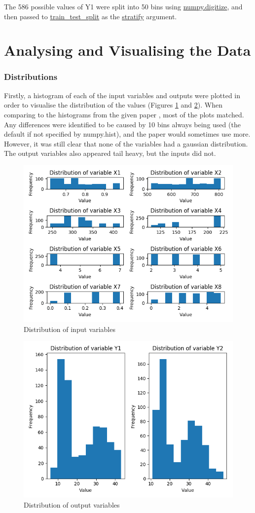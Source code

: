 \documentclass[12pt]{article}
\begin{document}
The 586 possible values of Y1 were split into 50 bins using \url{numpy.digitize}, and then passed to \url{train_test_split} as the \url{stratify} argument. 

\part{Analysing and Visualising the Data}

\section{Distributions}

Firstly, a histogram of each of the input variables and outputs were plotted in order to visualise the distribution of the values (Figures \ref{fig:xdist} and \ref{fig:ydist}). When comparing to the histograms from the given paper \cite{tsanas_xifara_2012}, most of the plots matched. Any differences were identified to be caused by 10 bins always being used (the default if not specified by numpy.hist), and the paper would sometimes use more. However, it was still clear that none of the variables had a gaussian distribution. The output variables also appeared tail heavy, but the inputs did not.

\begin{figure}[!ht]
\centering
\includegraphics[width=0.8 \linewidth]{images/XDist}
\caption{Distribution of input variables}
\label{fig:xdist}
\end{figure}

\begin{figure}[!ht]
\centering
\includegraphics[width=0.8 \linewidth]{images/YDist}
\caption{Distribution of output variables}
\label{fig:ydist}
\end{figure}
\end{document}
